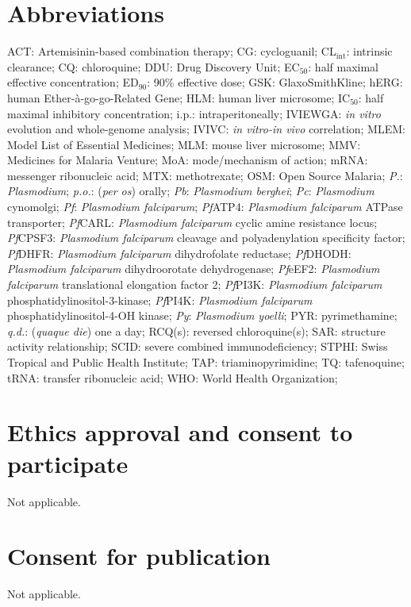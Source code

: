 \documentclass[twocolumn]{bmcart}%
\begin{document}
\begin{backmatter}

\section*{Abbreviations}
ACT: Artemisinin-based combination therapy;
CG: cycloguanil;
CL$_\textrm{int}$: intrinsic clearance;
CQ: chloroquine;
DDU: Drug Discovery Unit;
EC$_{50}$: half maximal effective concentration;
ED$_{90}$: 90\% effective dose;
GSK: GlaxoSmithKline;
hERG: human Ether-à-go-go-Related Gene;
HLM: human liver microsome;
IC$_{50}$: half maximal inhibitory concentration;
i.p.: intraperitoneally;
IVIEWGA: \textit{in vitro} evolution and whole-genome analysis;
IVIVC: \textit{in vitro-in vivo} correlation;
MLEM: Model List of Essential Medicines;
MLM: mouse liver microsome;
MMV: Medicines for Malaria Venture;
MoA: mode/mechanism of action;
mRNA: messenger ribonucleic acid;
MTX: methotrexate;
OSM: Open Source Malaria;
\textit{P.}: \textit{Plasmodium};
\textit{p.o.}: (\textit{per os}) orally;
\textit{Pb}: \textit{Plasmodium berghei};
\textit{Pc}: \textit{Plasmodium} cynomolgi;
\textit{Pf}: \textit{Plasmodium falciparum};
\textit{Pf}ATP4: \textit{Plasmodium falciparum} ATPase transporter;
\textit{Pf}CARL: \textit{Plasmodium falciparum} cyclic amine resistance locus;
\textit{Pf}CPSF3: \textit{Plasmodium falciparum} cleavage and polyadenylation specificity factor;
\textit{Pf}DHFR: \textit{Plasmodium falciparum} dihydrofolate reductase;
\textit{Pf}DHODH: \textit{Plasmodium falciparum} dihydroorotate dehydrogenase;
\textit{Pf}eEF2: \textit{Plasmodium falciparum} translational elongation factor 2;
\textit{Pf}PI3K: \textit{Plasmodium falciparum} phosphatidylinositol-3-kinase;
\textit{Pf}PI4K: \textit{Plasmodium falciparum} phosphatidylinositol-4-OH kinase;
\textit{Py}: \textit{Plasmodium yoelli};
PYR: pyrimethamine; 
\textit{q.d.}: (\textit{quaque die}) one a day;
RCQ(s): reversed chloroquine(s);
SAR: structure activity relationship;
SCID: severe combined immunodeficiency;
STPHI: Swiss Tropical and Public Health Institute;
TAP: triaminopyrimidine;
TQ: tafenoquine;
tRNA: transfer ribonucleic acid;
WHO: World Health Organization;

\section*{Ethics approval and consent to participate}
Not applicable.

\section*{Consent for publication}
Not applicable.


\end{backmatter}
\end{document}
